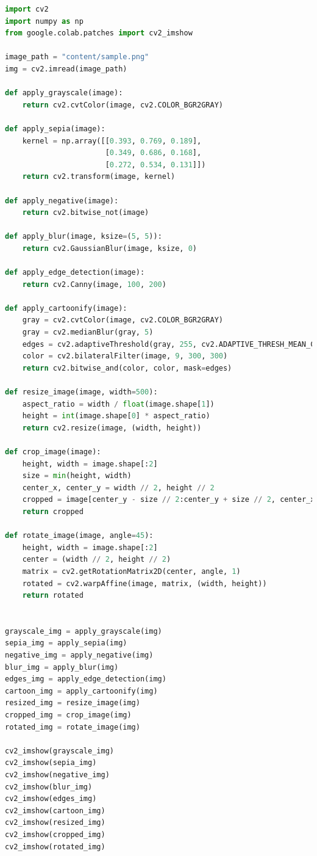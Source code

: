 \documentclass{report}
\begin{document}
\begin{lstlisting}[language=Python, caption=Image Processing Code, label=code:image-processing]
import cv2
import numpy as np
from google.colab.patches import cv2_imshow

image_path = "content/sample.png"
img = cv2.imread(image_path)

def apply_grayscale(image):
    return cv2.cvtColor(image, cv2.COLOR_BGR2GRAY)

def apply_sepia(image):
    kernel = np.array([[0.393, 0.769, 0.189],
                       [0.349, 0.686, 0.168],
                       [0.272, 0.534, 0.131]])
    return cv2.transform(image, kernel)

def apply_negative(image):
    return cv2.bitwise_not(image)

def apply_blur(image, ksize=(5, 5)):
    return cv2.GaussianBlur(image, ksize, 0)

def apply_edge_detection(image):
    return cv2.Canny(image, 100, 200)

def apply_cartoonify(image):
    gray = cv2.cvtColor(image, cv2.COLOR_BGR2GRAY)
    gray = cv2.medianBlur(gray, 5)
    edges = cv2.adaptiveThreshold(gray, 255, cv2.ADAPTIVE_THRESH_MEAN_C, cv2.THRESH_BINARY, 9, 9)
    color = cv2.bilateralFilter(image, 9, 300, 300)
    return cv2.bitwise_and(color, color, mask=edges)

def resize_image(image, width=500):
    aspect_ratio = width / float(image.shape[1])
    height = int(image.shape[0] * aspect_ratio)
    return cv2.resize(image, (width, height))

def crop_image(image):
    height, width = image.shape[:2]
    size = min(height, width)
    center_x, center_y = width // 2, height // 2
    cropped = image[center_y - size // 2:center_y + size // 2, center_x - size // 2:center_x + size // 2]
    return cropped

def rotate_image(image, angle=45):
    height, width = image.shape[:2]
    center = (width // 2, height // 2)
    matrix = cv2.getRotationMatrix2D(center, angle, 1)
    rotated = cv2.warpAffine(image, matrix, (width, height))
    return rotated


grayscale_img = apply_grayscale(img)
sepia_img = apply_sepia(img)
negative_img = apply_negative(img)
blur_img = apply_blur(img)
edges_img = apply_edge_detection(img)
cartoon_img = apply_cartoonify(img)
resized_img = resize_image(img)
cropped_img = crop_image(img)
rotated_img = rotate_image(img)

cv2_imshow(grayscale_img)
cv2_imshow(sepia_img)
cv2_imshow(negative_img)
cv2_imshow(blur_img)
cv2_imshow(edges_img)
cv2_imshow(cartoon_img)
cv2_imshow(resized_img)
cv2_imshow(cropped_img)
cv2_imshow(rotated_img)
\end{lstlisting}
\end{document}
